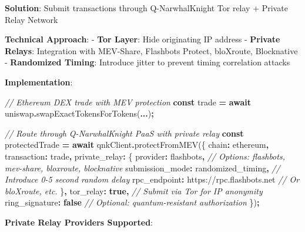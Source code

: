 \documentclass[
  11pt,
]{article}
\newenvironment{Shaded}{\begin{snugshade}}{\end{snugshade}}
\newcommand{\CommentTok}[1]{\textcolor[rgb]{0.56,0.35,0.01}{\textit{#1}}}
\newcommand{\ControlFlowTok}[1]{\textcolor[rgb]{0.13,0.29,0.53}{\textbf{#1}}}
\newcommand{\DataTypeTok}[1]{\textcolor[rgb]{0.13,0.29,0.53}{#1}}
\newcommand{\FunctionTok}[1]{\textcolor[rgb]{0.00,0.00,0.00}{#1}}
\newcommand{\KeywordTok}[1]{\textcolor[rgb]{0.13,0.29,0.53}{\textbf{#1}}}
\newcommand{\NormalTok}[1]{#1}
\newcommand{\OperatorTok}[1]{\textcolor[rgb]{0.81,0.36,0.00}{\textbf{#1}}}
\newcommand{\StringTok}[1]{\textcolor[rgb]{0.31,0.60,0.02}{#1}}
\begin{document}
\textbf{Solution}: Submit transactions through Q-NarwhalKnight Tor relay
+ Private Relay Network

\textbf{Technical Approach}: - \textbf{Tor Layer}: Hide originating IP
address - \textbf{Private Relays}: Integration with MEV-Share, Flashbots
Protect, bloXroute, Blocknative - \textbf{Randomized Timing}: Introduce
jitter to prevent timing correlation attacks

\textbf{Implementation}:

\begin{Shaded}
\begin{Highlighting}[]
\CommentTok{// Ethereum DEX trade with MEV protection}
\KeywordTok{const}\NormalTok{ trade }\OperatorTok{=} \ControlFlowTok{await}\NormalTok{ uniswap}\OperatorTok{.}\FunctionTok{swapExactTokensForTokens}\NormalTok{(}\OperatorTok{...}\NormalTok{)}\OperatorTok{;}

\CommentTok{// Route through Q{-}NarwhalKnight PaaS with private relay}
\KeywordTok{const}\NormalTok{ protectedTrade }\OperatorTok{=} \ControlFlowTok{await}\NormalTok{ qnkClient}\OperatorTok{.}\FunctionTok{protectFromMEV}\NormalTok{(\{}
  \DataTypeTok{chain}\OperatorTok{:} \StringTok{\textquotesingle{}ethereum\textquotesingle{}}\OperatorTok{,}
  \DataTypeTok{transaction}\OperatorTok{:}\NormalTok{ trade}\OperatorTok{,}
  \DataTypeTok{private\_relay}\OperatorTok{:}\NormalTok{ \{}
    \DataTypeTok{provider}\OperatorTok{:} \StringTok{\textquotesingle{}flashbots\textquotesingle{}}\OperatorTok{,}  \CommentTok{// Options: flashbots, mev{-}share, bloxroute, blocknative}
    \DataTypeTok{submission\_mode}\OperatorTok{:} \StringTok{\textquotesingle{}randomized\_timing\textquotesingle{}}\OperatorTok{,}  \CommentTok{// Introduce 0{-}5 second random delay}
    \DataTypeTok{rpc\_endpoint}\OperatorTok{:} \StringTok{\textquotesingle{}https://rpc.flashbots.net\textquotesingle{}}  \CommentTok{// Or bloXroute, etc.}
\NormalTok{  \}}\OperatorTok{,}
  \DataTypeTok{tor\_relay}\OperatorTok{:} \KeywordTok{true}\OperatorTok{,}  \CommentTok{// Submit via Tor for IP anonymity}
  \DataTypeTok{ring\_signature}\OperatorTok{:} \KeywordTok{false}  \CommentTok{// Optional: quantum{-}resistant authorization}
\NormalTok{\})}\OperatorTok{;}
\end{Highlighting}
\end{Shaded}

\textbf{Private Relay Providers Supported}:
\end{document}

